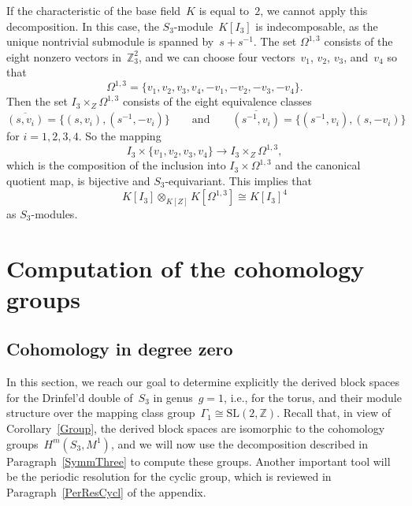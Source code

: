 \documentclass[12pt]{article}
\theoremstyle{definition}
\theoremstyle{break}
\newcommand{\Z}{\mathbb{Z}}
\newcommand{\SL}{\mathrm{SL}}
\renewcommand{\1}{\mathbbm{1}}
\newcommand{\ot}{\mathbin{\otimes}}
\begin{document}
If the characteristic of the base field~$K$ is equal to~$2$, we cannot apply this decomposition. In this case, the $S_3$-module~$K[I_3]$ is indecomposable, as the unique nontrivial submodule is spanned by~$s + s^{-1}$. The set $\Omega^{1,3}$ consists of the eight nonzero vectors in~$\Z_3^2$, and we can choose four vectors~$v_1$, $v_2$, $v_3$, and~$v_4$ so that
\[\Omega^{1,3} = \{v_1, v_2, v_3, v_4, -v_1, -v_2, -v_3, -v_4\}.\]
Then the set $I_3 \times_Z \Omega^{1,3}$ consists of the eight equivalence classes
\[\overline{(s,v_i)} = \{(s,v_i), (s^{-1},-v_i)\} \qquad \text{and} \qquad
\overline{(s^{-1},v_i)} = \{(s^{-1},v_i), (s,-v_i)\}\]
for $i=1,2,3,4$. So the mapping
\[I_3 \times \{v_1, v_2, v_3, v_4\} \to I_3 \times_Z \Omega^{1,3},\]
which is the composition of the inclusion into $I_3 \times \Omega^{1,3}$ and the canonical quotient map, is bijective and $S_3$-equivariant. This implies that
\[K[I_3] \ot_{K[Z]} K[\Omega^{1,3}] \cong K[I_3]^4\]
as $S_3$-modules.


\section{Computation of the cohomology groups} \label{Sec:CompCoh}
\subsection{Cohomology in degree zero} \label{DegZero}
In this section, we reach our goal to determine explicitly the derived block spaces for the Drinfel'd double of~$S_3$ in genus~$g=1$, i.e., for the torus, and their module structure over the mapping class group~$\Gamma_1 \cong \SL(2,\Z)$. Recall that, in view \linebreak of Corollary~\ref{Group},
the derived block spaces are isomorphic to the cohomology \linebreak groups~$H^m(S_3, M^1)$, and we will now use the decomposition described in Paragraph~\ref{SymmThree} to compute these groups. Another important tool will be the periodic resolution for the cyclic group, which is reviewed in Paragraph~\ref{PerResCycl} of the appendix.
\end{document}
